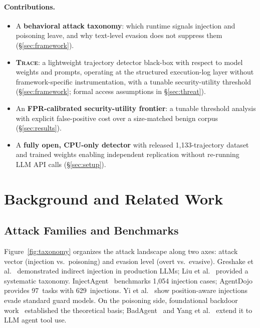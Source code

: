 \documentclass[conference]{IEEEtran}
\begin{document}
\paragraph{Contributions.}
\begin{itemize}[leftmargin=*,topsep=2pt,itemsep=1pt]
  \item A \textbf{behavioral attack taxonomy}: which runtime signals
    injection and poisoning leave, and why text-level evasion does
    not suppress them (\S\ref{sec:framework}).
  \item \textbf{\textsc{Trace}}: a lightweight trajectory detector
    black-box with respect to model weights and prompts, operating at
    the structured execution-log layer without framework-specific
    instrumentation, with a tunable security-utility threshold
    (\S\ref{sec:framework}; formal access assumptions in \S\ref{sec:threat}).
  \item An \textbf{FPR-calibrated security-utility frontier}: a
    tunable threshold analysis with explicit false-positive cost over
    a size-matched benign corpus (\S\ref{sec:results}).
  \item A \textbf{fully open, CPU-only detector} with released
    1{,}133-trajectory dataset and trained weights enabling independent
    replication without re-running LLM API calls (\S\ref{sec:setup}).
\end{itemize}

\section{Background and Related Work}
\label{sec:background}

\subsection{Attack Families and Benchmarks}

Figure~\ref{fig:taxonomy} organizes the attack landscape along two
axes: attack vector (injection vs.\ poisoning) and evasion level
(overt vs.\ evasive).  Greshake et al.~\cite{greshake2023not}
demonstrated indirect injection in production LLMs;
Liu et al.~\cite{liu2023prompt} provided a systematic taxonomy.
InjectAgent~\cite{zhan2024injectagent} benchmarks 1{,}054 injection
cases; AgentDojo~\cite{debenedetti2024agentdojo} provides 97~tasks
with 629~injections.  Yi et al.~\cite{yi2023benchmarking} show
position-aware injections evade standard guard models.  On the
poisoning side, foundational backdoor work~\cite{gu2019badnets,
li2022backdoor} established the theoretical basis; BadAgent~\cite{shi2024badagent}
and Yang et al.~\cite{yang2024watch} extend it to LLM agent tool use.
\end{document}
